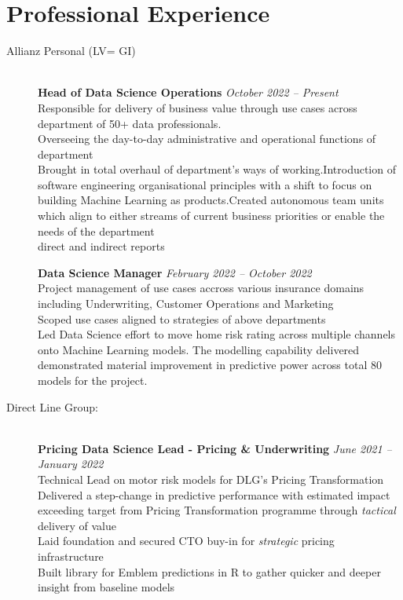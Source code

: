\documentclass[11pt]{article}
\begin{document}
\section*{Professional Experience}
\begin{description}

\item[Allianz Personal (LV= GI)] \hspace{1mm}\\
\textbf{Head of Data Science Operations} \emph{October 2022 -- Present} \\
\textbullet \quad Responsible for delivery of business value through use cases across department of 50+ data professionals.\\
\textbullet \quad Overseeing the day-to-day administrative and operational functions of department \\
\textbullet \quad Brought in total overhaul of department's ways of working.\quad Introduction of software engineering organisational principles with a shift to focus on building Machine Learning as products.\quad Created autonomous team units which align to either streams of current business priorities or enable the needs of the department \\
\textbullet {} direct and indirect reports

\textbf{Data Science Manager} \emph{February 2022 -- October 2022} \\
\textbullet \quad Project management of use cases accross various insurance domains including Underwriting, Customer Operations and Marketing\\
\textbullet \quad Scoped use cases aligned to strategies of above departments \\
\textbullet \quad Led Data Science effort to move home risk rating across multiple channels onto Machine Learning models. The modelling capability delivered demonstrated material improvement in predictive power across total 80 models for the project.\\

\item[Direct Line Group:] \hspace{1mm}\\
\textbf{Pricing Data Science Lead - Pricing \& Underwriting} \emph{June 2021 -- January 2022} \\
\textbullet \quad Technical Lead on motor risk models for DLG's Pricing Transformation\\
\textbullet \quad Delivered a step-change in predictive performance with 
estimated impact exceeding target from Pricing Transformation programme through \emph{tactical} delivery of value\\
\textbullet \quad Laid foundation and secured CTO buy-in for \emph{strategic} pricing infrastructure\\
\textbullet \quad Built library for Emblem predictions in R to gather quicker and deeper insight from baseline models\\


\end{description}
\end{document}
